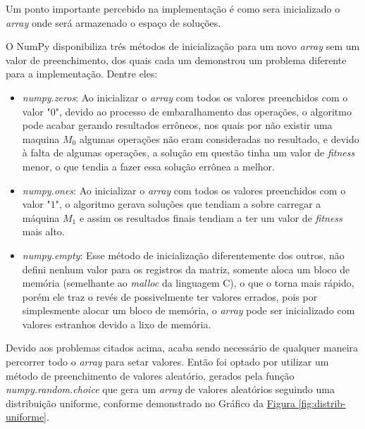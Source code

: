                 Um ponto importante percebido na implementação é como sera inicializado o \textit{array} onde será armazenado o espaço de soluções.\hfill\vspace{\onelineskip}

                O NumPy disponibiliza trés métodos de inicialização para um novo \textit{array} sem um valor de preenchimento, dos quais cada um demonstrou um problema diferente para a implementação. Dentre eles: 
                \begin{itemize}
                    \item \textit{numpy.zeros}: Ao inicializar o \textit{array} com todos os valores preenchidos com o valor "$0$", devido ao processo de embaralhamento das operações, o algoritmo pode acabar gerando resultados errôneos, nos quais por não existir uma maquina $M_0$ algumas operações não eram consideradas no resultado, e devido à falta de algumas operações, a solução em questão tinha um valor de \textit{fitness} menor, o que tendia a fazer essa solução errônea a melhor.

                    \item \textit{numpy.ones}: Ao inicializar o \textit{array} com todos os valores preenchidos com o valor "$1$", o algoritmo gerava soluções que tendiam a sobre carregar a máquina $M_1$ e assim os resultados finais tendiam a ter um valor de \textit{fitness} mais alto.

                    \item \textit{numpy.empty}: Esse método de inicialização diferentemente dos outros, não defini nenhum valor para os registros da matriz, somente aloca um bloco de memória (semelhante ao \textit{malloc} da linguagem C), o que o torna mais rápido, porém ele traz o revés de possivelmente ter valores errados, pois por simplesmente alocar um bloco de memória, o \textit{array} pode ser inicializado com valores estranhos devido a lixo de memória.
                \end{itemize}

                \noindent Devido aos problemas citados acima, acaba sendo necessário de qualquer maneira percorrer todo o \textit{array} para setar valores. \newline 
                Então foi optado por utilizar um método de preenchimento de valores aleatório, 
                gerados pela função \textit{numpy.random.choice} que gera um \textit{array} de valores aleatórios seguindo uma distribuição uniforme, 
                conforme demonstrado no Gráfico da \hyperref[fig:distrib-uniforme]{Figura \ref{fig:distrib-uniforme}}.


